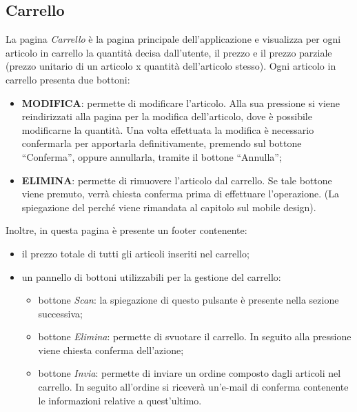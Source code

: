 \documentclass[12pt, a4paper, titlepage]{report}
\begin{document}
	\subsection{Carrello}
	La pagina \textit{Carrello} è la pagina principale dell'applicazione e visualizza per ogni articolo in carrello la quantità decisa dall'utente, il prezzo e il prezzo parziale (prezzo unitario di un articolo x quantità dell'articolo stesso). Ogni articolo in carrello presenta due bottoni: 
	\begin{itemize}
		\item \textbf{MODIFICA}: permette di modificare l'articolo. Alla sua pressione si viene reindirizzati alla pagina per la modifica dell'articolo, dove è possibile modificarne la quantità. Una volta effettuata la modifica è necessario confermarla per apportarla definitivamente, premendo sul bottone ``Conferma'', oppure annullarla, tramite il bottone ``Annulla'';
		\item \textbf{ELIMINA}: permette di rimuovere l'articolo dal carrello. Se tale bottone viene premuto, verrà chiesta conferma prima di effettuare l'operazione. (La spiegazione del perché viene rimandata al capitolo sul mobile design).
	\end{itemize}
	Inoltre, in questa pagina è presente un footer contenente:
	\begin{itemize}
		\item il prezzo totale di tutti gli articoli inseriti nel carrello;
		\item un pannello di bottoni utilizzabili per la gestione del carrello:
		\begin{itemize}
			\item bottone \textit{Scan}: la spiegazione di questo pulsante è presente nella sezione successiva;
			\item bottone \textit{Elimina}: permette di svuotare il carrello. In seguito alla pressione viene chiesta conferma dell'azione;
			\item bottone \textit{Invia}: permette di inviare un ordine composto dagli articoli nel carrello. In seguito all'ordine si riceverà un'e-mail di conferma contenente le informazioni relative a quest'ultimo.
		\end{itemize}
	\end{itemize} 
	
\end{document}
